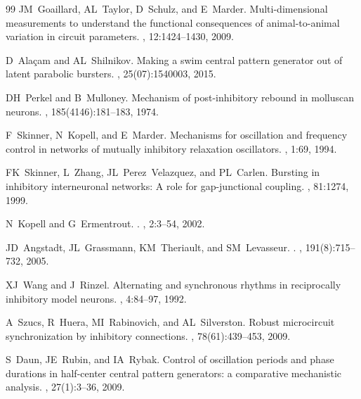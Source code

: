 \documentclass[nofootinbib,aip,amsmath,amssymb,reprint,twocolumn,10pt]{revtex4-2}
\begin{document}
\begin{thebibliography}{99}
JM~Goaillard, AL~Taylor, D~Schulz, and E~Marder.
\newblock Multi-dimensional measurements to understand the functional
  consequences of animal-to-animal variation in circuit parameters.
, 12:1424--1430, 2009.

D~Ala\c{c}am and AL~Shilnikov.
\newblock Making a swim central pattern generator out of latent parabolic
  bursters.
, 25(07):1540003,
  2015.


DH~Perkel and B~Mulloney.
\newblock Mechanism of post-inhibitory rebound in molluscan neurons.
, 185(4146):181--183, 1974.

F~Skinner, N~Kopell, and E~Marder.
\newblock Mechanisms for oscillation and frequency control in networks of
  mutually inhibitory relaxation oscillators.
, 1:69, 1994.

FK~Skinner, L~Zhang, JL~Perez~Velazquez, and PL~Carlen.
\newblock Bursting in inhibitory interneuronal networks: A role for
  gap-junctional coupling.
, 81:1274, 1999.

N~Kopell and G~Ermentrout.
.
, 2:3--54, 2002.

JD~Angstadt, JL~Grassmann, KM~Theriault, and SM~Levasseur.
.
, 191(8):715--732, 2005.
  
XJ~Wang and J~Rinzel.
\newblock Alternating and synchronous rhythms in reciprocally inhibitory model
  neurons.
, {4}:84--97, {1992}.

A~Szucs, R~Huera, MI~Rabinovich, and AL~Silverston.
\newblock Robust microcircuit synchronization by inhibitory connections.
, 78(61):439--453, 2009.

S~Daun, JE~Rubin, and IA~Rybak.
\newblock Control of oscillation periods and phase durations in half-center
  central pattern generators: a comparative mechanistic analysis.
, 27(1):3--36, 2009.


\end{thebibliography}
\end{document}
